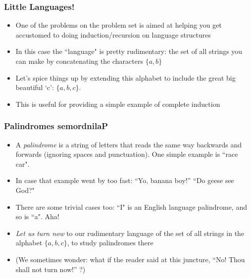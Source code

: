  \begin{frame}
\frametitle{Little Languages!}

\begin{itemize}[<+->]
\item One of the problems on the problem set is aimed at helping you get accustomed to doing induction/recursion on language structures 

\item In this case the ``language" is pretty rudimentary: the set of all strings you can make by concatenating the characters $\{a,b\}$

\item Let's spice things up by extending this alphabet to include the great big beautiful `c': $\{a,b,c\}$. 


\item This is useful for providing a simple example of complete induction %

\end{itemize} 
\end{frame}

\begin{frame}
\frametitle{Palindromes  semordnilaP}

\begin{itemize}[<+->]
\item A \emph{palindrome} is a string of letters that reads the same way backwards and forwards (ignoring spaces and punctuation). One simple example is ``race car".

\item In case that example went by too fast: ``Yo, banana boy!'' ``Do geese see God?"


\item  There are some trivial cases too: ``I" is an English language palindrome, and so is ``a". Aha! 

\item \textit{Let us turn now} to our rudimentary language of the set of all strings in the alphabet $\{a,b,c\}$, to study palindromes there

\item[] (We sometimes wonder: what if the reader said at this juncture, ``No! Thou shall not turn now!'' ?) 


\end{itemize} 
\end{frame}


